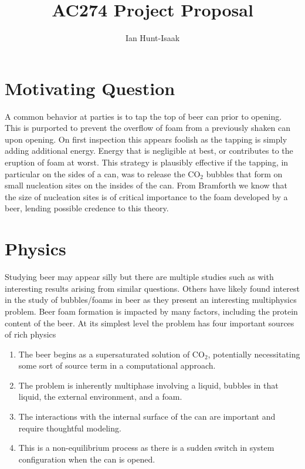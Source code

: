 \documentclass[10pt,a4paper]{article}
\title{AC274 Project Proposal}
\author{Ian Hunt-Isaak}
\begin{document}
	\maketitle
	

	\section{Motivating Question}
	A common behavior at parties is to tap the top of beer can prior to opening. This is purported to prevent the overflow of foam from a previously shaken can upon opening. On first inspection this appears foolish as the tapping is simply adding additional energy. Energy that is negligible at best, or contributes to the eruption of foam at worst. This strategy is plausibly effective if the tapping, in particular on the sides of a can, was to release the $\mathrm{CO}_2$ bubbles that form on small nucleation sites on the insides of the can. From Bramforth \cite{bamforth_relative_2004} we know that the size of nucleation sites is of critical importance to the foam developed by a beer, lending possible credence to this theory.

	\section{Physics}
	Studying beer may appear silly but there are multiple studies such as \cite{lee_bubble_2011,mantic-lugo_beer_2015,benilov_why_2013} with interesting results arising from  similar questions. 
	Others have likely found interest in the study of bubbles/foams in beer as they present an interesting multiphysics problem. Beer foam formation is impacted by many factors, including the protein content of the beer. At its simplest level the problem has four important sources of rich physics
	\begin{enumerate}
		\item The beer begins as a supersaturated solution of $\mathrm{CO}_2$, potentially necessitating some sort of source term in a computational approach.
		\item The problem is inherently multiphase involving a liquid, bubbles in that liquid, the external environment, and a foam. 
		\item The interactions with the internal surface of the can are important and require thoughtful modeling.
		\item This is a non-equilibrium process as there is a sudden switch in system configuration when the can is opened.
	\end{enumerate}
	
\end{document}
